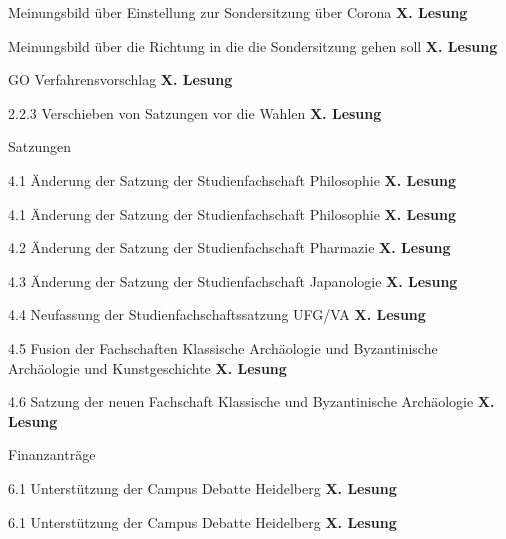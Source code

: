 Meinungsbild über Einstellung zur Sondersitzung über Corona
\textbf{X. Lesung}
\ul{
}

Meinungsbild über die Richtung in die die Sondersitzung gehen soll 
\textbf{X. Lesung}
\ul{
}

GO Verfahrensvorschlag
\textbf{X. Lesung}
\ul{
}

2.2.3 Verschieben von Satzungen vor die Wahlen
\textbf{X. Lesung}
\ul{
}

Satzungen

4.1 Änderung der Satzung der Studienfachschaft Philosophie
\textbf{X. Lesung}
\ul{
}

4.1 Änderung der Satzung der Studienfachschaft Philosophie
\textbf{X. Lesung}
\ul{
}

4.2 Änderung der Satzung der Studienfachschaft Pharmazie
\textbf{X. Lesung}
\ul{
}

4.3 Änderung der Satzung der Studienfachschaft Japanologie 
\textbf{X. Lesung}
\ul{
}

4.4 Neufassung der Studienfachschaftssatzung UFG/VA 
\textbf{X. Lesung}
\ul{
}

4.5 Fusion der Fachschaften Klassische Archäologie und Byzantinische Archäologie und Kunstgeschichte
\textbf{X. Lesung}
\ul{
}

4.6 Satzung der neuen Fachschaft Klassische und Byzantinische Archäologie 
\textbf{X. Lesung}
\ul{
}

Finanzanträge

6.1 Unterstützung der Campus Debatte Heidelberg 
\textbf{X. Lesung}
\ul{
}

6.1 Unterstützung der Campus Debatte Heidelberg 
\textbf{X. Lesung}
\ul{
}


